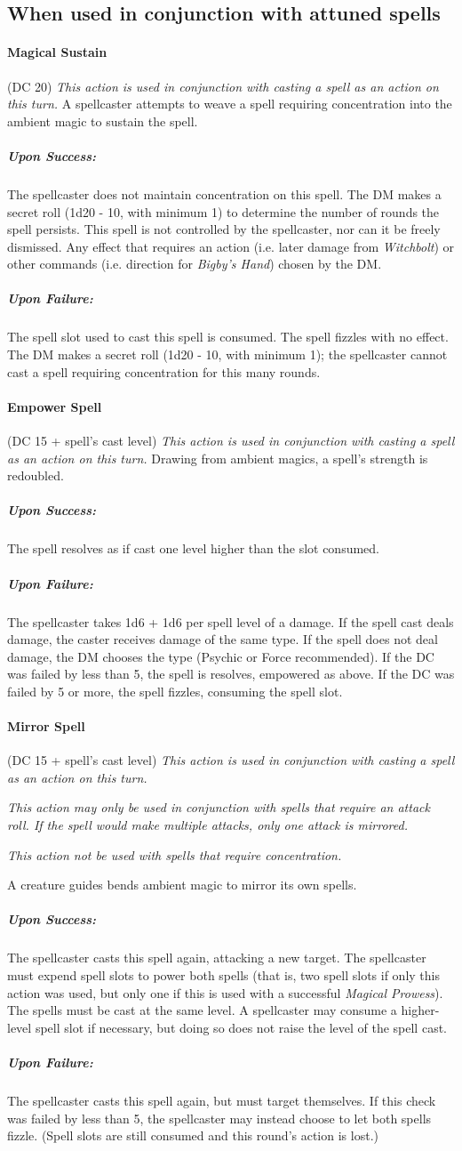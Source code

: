 \documentclass{article}
\newcommand{\action}[2]{\paragraph*{{\color{tan}#1}} (DC #2)\newline}
\newcommand{\success}{\subparagraph*{{\color{tan}Upon Success:}}}
\newcommand{\failure}{\subparagraph*{{\color{tan}Upon Failure:}}}
\newcommand{\attuned}{ {\em \color{req} This action is used in conjunction with casting a spell as an action on this turn.} }
\begin{document}
\begin{multicols}{2}
  \section*{When used in conjunction with attuned spells}

\action{Magical Sustain}{20}
\attuned
  A spellcaster attempts to weave a spell requiring concentration into the ambient magic to sustain the spell.
\success
  The spellcaster does not maintain concentration on this spell.
  The DM makes a secret roll (1d20 - 10, with minimum 1) to determine the number of rounds the spell persists.
  This spell is not controlled by the spellcaster, nor can it be freely dismissed.
  Any effect that requires an action (i.e. later damage from {\it Witchbolt}) or other commands (i.e. direction for {\it Bigby's Hand}) chosen by the DM.

\failure
  The spell slot used to cast this spell is consumed.
  The spell fizzles with no effect.
  The DM makes a secret roll (1d20 - 10, with minimum 1); the spellcaster cannot cast a spell requiring concentration for this many rounds.

\action{Empower Spell}{15 + spell's cast level}
  \attuned
  Drawing from ambient magics, a spell's strength is redoubled.
\success
  The spell resolves as if cast one level higher than the slot consumed.
\failure
  The spellcaster takes 1d6 + 1d6 per spell level of a damage.
  If the spell cast deals damage, the caster receives damage of the same type.
  If the spell does not deal damage, the DM chooses the type (Psychic or Force recommended).
  If the DC was failed by less than 5, the spell is resolves, empowered as above.
  If the DC was failed by 5 or more, the spell fizzles, consuming the spell slot.

\action{Mirror Spell}{15 + spell's cast level}
  \attuned

  {\it
   This action may only be used in conjunction with spells that require an attack roll.
   If the spell would make multiple attacks, only one attack is mirrored.}

  {\it This action not be used with spells that require concentration.}

  A creature guides bends ambient magic to mirror its own spells.
\success
  The spellcaster casts this spell again, attacking a new target.
  The spellcaster must expend spell slots to power both spells (that is, two spell slots if only this action was used, but only one if this is used with a successful {\it Magical Prowess}).
  The spells must be cast at the same level.
  A spellcaster may consume a higher-level spell slot if necessary, but doing so does not raise the level of the spell cast.
\failure
  The spellcaster casts this spell again, but must target themselves.
  If this check was failed by less than 5, the spellcaster may instead choose to let both spells fizzle.
  (Spell slots are still consumed and this round's action is lost.)


\end{multicols}
\end{document}

